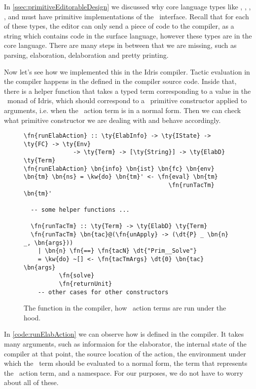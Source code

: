In \autoref{ssec:primitiveEditorableDesign} we discussed why core language
types like , , , , and
 must have primitive implementations of the
\Editorable\ interface. Recall that for each of these types, the editor can
only send a piece of code to the compiler, as a string which contains code in
the surface language, however these types are in the core language. There are
many steps in between that we are missing, such as parsing, elaboration,
delaboration and pretty printing.

Now let's see how we implemented this in the Idris compiler. Tactic evaluation
in the compiler happens in the  defined in the compiler
source code. Inside that, there is a helper function  that takes a
typed term corresponding to a value in the \Elab\ monad of Idris, which should
correspond to a \Elab\ primitive constructor applied to arguments, i.e. when
the \Elab\ action term is in a normal form. Then we can check what primitive
constructor we are dealing with and behave accordingly.

\begin{figure}[ht]
\caption{The  function in the compiler, how \Elab\ action terms are run under the hood.}
\label{code:runElabAction}
\begin{Verbatim}[framesep=2mm, label=\footnotesize{\normalfont{Haskell}}, labelposition=topline]
\fn{runElabAction} :: \ty{ElabInfo} -> \ty{IState} -> \ty{FC} -> \ty{Env}
              -> \ty{Term} -> [\ty{String}] -> \ty{ElabD} \ty{Term}
\fn{runElabAction} \bn{info} \bn{ist} \bn{fc} \bn{env} \bn{tm} \bn{ns} = \kw{do} \bn{tm}' <- \fn{eval} \bn{tm}
                                         \fn{runTacTm} \bn{tm}'

  -- some helper functions ...

  \fn{runTacTm} :: \ty{Term} -> \ty{ElabD} \ty{Term}
  \fn{runTacTm} \bn{tac}@(\fn{unApply} -> (\dt{P} _ \bn{n} _, \bn{args}))
    | \bn{n} \fn{==} \fn{tacN} \dt{"Prim__Solve"}
    = \kw{do} ~[] <- \fn{tacTmArgs} \dt{0} \bn{tac} \bn{args}
          \fn{solve}
          \fn{returnUnit}
    -- other cases for other constructors
\end{Verbatim}
\end{figure}

In \autoref{code:runElabAction} we can observe how  is
defined in the compiler.
It takes many arguments, such as informaion for the elaborator, the internal
state of the compiler at that point, the source location of the action, the
environment under which the \Elab\ term should be evaluated to a normal form, the
term that represents the \Elab\ action term, and a namespace.  For our purposes,
we do not have to worry about all of these.

